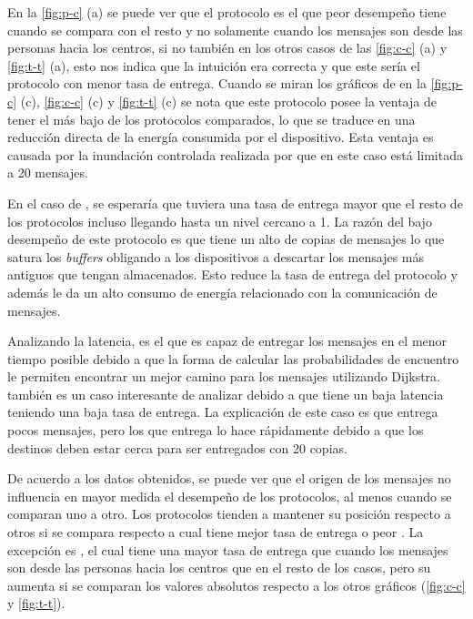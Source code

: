 

En la \ref{fig:p-c} (a) se puede ver que el protocolo \syw{} es el que peor
desempeño tiene cuando se compara con el resto y no solamente cuando los
mensajes son desde las personas hacia los centros, si no también en los otros
casos de las \ref{fig:c-c} (a) y \ref{fig:t-t} (a), esto nos indica que la
intuición era correcta y que este sería el protocolo con menor tasa de entrega.
Cuando se miran los gráficos de \overhead{} en la \ref{fig:p-c} (c),
\ref{fig:c-c} (c) y \ref{fig:t-t} (c) se nota que este protocolo posee la
ventaja de tener el \overhead{} más bajo de los protocolos comparados, lo que se
traduce en una reducción directa de la energía consumida por el dispositivo.
Esta ventaja es causada por la inundación controlada realizada por \syw{} que
en este caso está limitada a 20 mensajes.

En el caso de \epidemic, se esperaría que tuviera una tasa de entrega mayor que
el resto de los protocolos incluso llegando hasta un nivel cercano a 1. La razón
del bajo desempeño de este protocolo es que \epidemic{} tiene un alto
\overhead{} de copias de mensajes lo que satura los \textit{buffers} obligando a
los dispositivos a descartar los mensajes más antiguos que tengan almacenados.
Esto reduce la tasa de entrega del protocolo y además le da un alto consumo de
energía relacionado con la comunicación de mensajes.

Analizando la latencia, \maxprop{} es el que es capaz de entregar los mensajes
en el menor tiempo posible debido a que la forma de calcular las probabilidades
de encuentro le permiten encontrar un mejor camino para los mensajes utilizando
Dijkstra. \syw{} también es un caso interesante de analizar debido a que tiene
un baja latencia teniendo una baja tasa de entrega. La explicación de este caso
es que \syw{} entrega pocos mensajes, pero los que entrega lo hace rápidamente
debido a que los destinos deben estar cerca para ser entregados con 20 copias.


De acuerdo a los datos obtenidos, se puede ver que el origen de los mensajes
no influencia en mayor medida el desempeño de los protocolos, al menos cuando se
comparan uno a otro. Los protocolos tienden a mantener su posición respecto a
otros si se compara respecto a cual tiene mejor tasa de entrega o peor
\overhead. La excepción es \epidemic, el cual tiene una mayor tasa de entrega
que \prophet{} cuando los mensajes son desde las personas hacia los centros que
en el resto de los casos, pero su \overhead{} aumenta si se comparan los valores
absolutos respecto a los otros gráficos (\ref{fig:c-c} y \ref{fig:t-t}).




